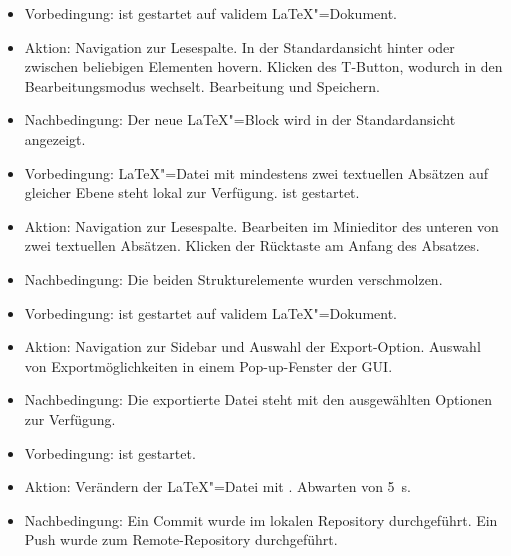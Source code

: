 \begin{itemize}
  \item Vorbedingung: \texla{} ist gestartet auf validem \LaTeX"=Dokument.
  \item Aktion: Navigation zur Lesespalte.
  In der Standardansicht hinter oder zwischen beliebigen Elementen hovern.
  Klicken des T-Button, wodurch \texla{} in den Bearbeitungsmodus wechselt.
  Bearbeitung und Speichern.
  \item Nachbedingung: Der neue \LaTeX"=Block wird in der Standardansicht angezeigt.
\end{itemize}

\begin{itemize}
  \item Vorbedingung: \LaTeX"=Datei mit mindestens zwei textuellen Absätzen auf gleicher Ebene steht lokal zur
  Verfügung.
  \texla{} ist gestartet.
  \item Aktion: Navigation zur Lesespalte.
  Bearbeiten im Minieditor des unteren von zwei textuellen Absätzen.
  Klicken der Rücktaste am Anfang des Absatzes.
  \item Nachbedingung: Die beiden Strukturelemente wurden verschmolzen.
\end{itemize}

\clearpage

\begin{itemize}
  \item Vorbedingung: \texla{} ist gestartet auf validem \LaTeX"=Dokument.
  \item Aktion: Navigation zur Sidebar und Auswahl der Export-Option.
  Auswahl von Exportmöglichkeiten in einem Pop-up-Fenster der GUI.
  \item Nachbedingung: Die exportierte Datei steht mit den ausgewählten Optionen zur Verfügung.
\end{itemize}

\begin{itemize}
  \item Vorbedingung: \texla{} ist gestartet.
  \item Aktion: Verändern der \LaTeX"=Datei mit \texla{}.
  Abwarten von 5~\si{\second}.
  \item Nachbedingung: Ein Commit wurde im lokalen Repository durchgeführt.
  Ein Push wurde zum Remote-Repository durchgeführt.
\end{itemize}

